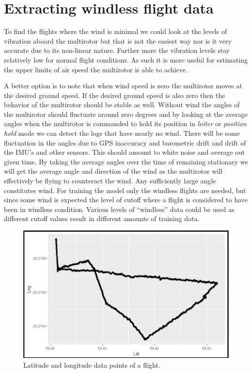 \documentclass[12pt,oneside]{reedthesis}
\theoremstyle{definition}
\theoremstyle{definition}
\theoremstyle{definition}
\theoremstyle{remark}
\begin{document}
\hypertarget{extracting-windless-flight-data}{\section{Extracting
windless flight data}\label{extracting-windless-flight-data}}

To find the flights where the wind is minimal we could look at the
levels of vibration aboard the multirotor but that is not the easiest
way nor is it very accurate due to its non-linear nature. Further more
the vibration levels stay relatively low for normal flight conditions.
As such it is more useful for estimating the upper limits of air speed
the multirotor is able to achieve.

A better option is to note that when wind speed is zero the multirotor
moves at the desired ground speed. If the desired ground speed is also
zero then the behavior of the multirotor should be stable as well.
Without wind the angles of the multirotor should fluctuate around zero
degrees and by looking at the average angles when the multirotor is
commanded to hold its position in \emph{loiter} or \emph{position}
\emph{hold} mode we can detect the logs that have nearly no wind. There
will be some fluctuation in the angles due to GPS inaccuracy and
barometric drift and drift of the IMU's and other sensors. This should
amount to white noise and average out given time. By taking the average
angles over the time of remaining stationary we will get the average
angle and direction of the wind as the multirotor will effectively be
flying to counteract the wind. Any sufficiently large angle constitutes
wind. For training the model only the windless flights are needed, but
since some wind is expected the level of cutoff where a flight is
considered to have been in windless condition. Various levels of
``windless'' data could be used as different cutoff values result in
different amounts of training data.
\begin{figure}
\centering
\includegraphics{./figure/latlng.PNG}
\caption{\label{fig:latlng}Latitude and longitude data points of a flight.}
\end{figure}
\end{document}
